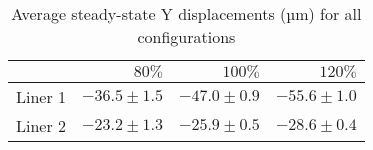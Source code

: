 \begin{table}[htbp!]
\centering
\begin{tabular}{lrrr}
\toprule
  & $80\%$ & $100\%$ & $120\%$ \\
\midrule
 Liner 1 & $-36.5 \pm 1.5$ & $-47.0 \pm 0.9$ & $-55.6 \pm 1.0$ \\
 Liner 2 & $-23.2 \pm 1.3$ & $-25.9 \pm 0.5$ & $-28.6 \pm 0.4$ \\
\bottomrule
\end{tabular}
\caption{Average steady-state Y displacements (µm) for all configurations}
\label{fig:avg_results_table}
\end{table}